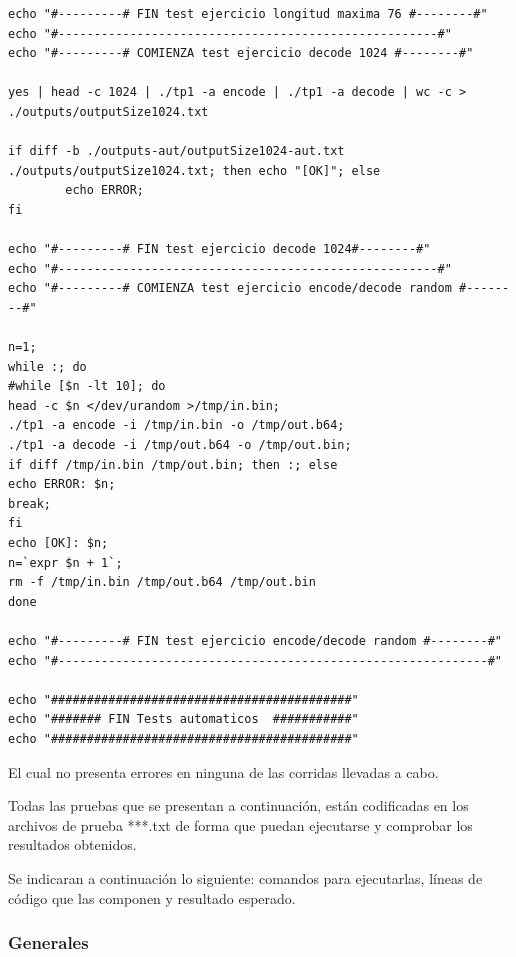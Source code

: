 \documentclass[11pt,a4paper]{article}
\begin{document}
\begin{lstlisting}
echo "#---------# FIN test ejercicio longitud maxima 76 #--------#"
echo "#-----------------------------------------------------#"
echo "#---------# COMIENZA test ejercicio decode 1024 #--------#"

yes | head -c 1024 | ./tp1 -a encode | ./tp1 -a decode | wc -c > ./outputs/outputSize1024.txt

if diff -b ./outputs-aut/outputSize1024-aut.txt ./outputs/outputSize1024.txt; then echo "[OK]"; else
		echo ERROR;
fi

echo "#---------# FIN test ejercicio decode 1024#--------#"
echo "#-----------------------------------------------------#"
echo "#---------# COMIENZA test ejercicio encode/decode random #--------#"

n=1;
while :; do
#while [$n -lt 10]; do
head -c $n </dev/urandom >/tmp/in.bin;
./tp1 -a encode -i /tmp/in.bin -o /tmp/out.b64;
./tp1 -a decode -i /tmp/out.b64 -o /tmp/out.bin;
if diff /tmp/in.bin /tmp/out.bin; then :; else
echo ERROR: $n;
break;
fi
echo [OK]: $n;
n=`expr $n + 1`;
rm -f /tmp/in.bin /tmp/out.b64 /tmp/out.bin
done

echo "#---------# FIN test ejercicio encode/decode random #--------#"
echo "#------------------------------------------------------------#"

echo "##########################################"
echo "####### FIN Tests automaticos  ###########"
echo "##########################################"
\end{lstlisting}

El cual no presenta errores en ninguna de las corridas llevadas a cabo.


Todas las pruebas que se presentan a continuación, están codificadas en los archivos de prueba ***.txt de forma que puedan ejecutarse y comprobar los resultados obtenidos.

Se indicaran a continuación lo siguiente: comandos para ejecutarlas, líneas de código que las componen y resultado esperado.


\subsubsection{Generales}
\end{document}
